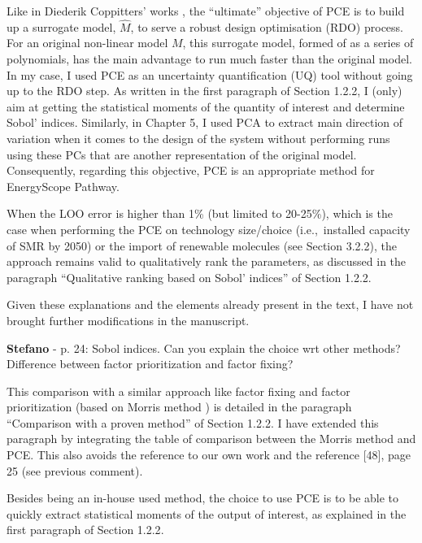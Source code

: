\documentclass[12pt,a4paper]{article}
\def\ie{i.e.,\ }
\begin{document}
\noindent Like in Diederik Coppitters' works \cite{coppitters2021robust,coppittersthesis}, the ``ultimate'' objective of PCE is to build up a surrogate model, $\hat{M}$, to serve a robust design optimisation (RDO) process. For an original non-linear model $M$, this surrogate model, formed of as a series of polynomials,  has the main advantage to run much faster than the original model. In my case, I used PCE as an uncertainty quantification (UQ) tool without going up to the RDO step. As written {\color{blue}in the first paragraph of Section 1.2.2}, I (only) aim at getting the statistical moments of the quantity of interest and determine Sobol' indices. Similarly, in Chapter 5, I used PCA to extract main direction of variation when it comes to the design of the system without performing runs using these PCs that are another representation of the original model. Consequently, regarding this objective, PCE is an appropriate method for EnergyScope Pathway. 

\noindent When the LOO error is higher than 1\% (but limited to 20-25\%), which is the case when performing the PCE on technology size/choice (\ie installed capacity of SMR by 2050) or the import of renewable molecules (see Section 3.2.2), the approach remains valid to qualitatively rank the parameters, {\color{blue}as discussed in the paragraph ``Qualitative ranking based on Sobol' indices'' of Section 1.2.2}.

\noindent Given these explanations and the elements already present in the text, I have not brought further modifications in the manuscript.

\begin{mdframed}[style=comment] %
{\color{orange} \textbf{Stefano}} - p. 24: Sobol indices. Can you explain the choice wrt other methods? Difference between factor prioritization and factor fixing?
\end{mdframed}

\noindent This comparison with a similar approach like factor fixing and factor prioritization (based on Morris method \cite{morris_factorial_1991}) is detailed {\color{blue}in the paragraph ``Comparison with a proven method'' of Section 1.2.2}. I have extended this paragraph by integrating the table of comparison between the Morris method and PCE.  This also avoids the reference to our own work and the reference [48], page 25 (see previous comment).

\noindent Besides being an in-house used method, the choice to use PCE is to be able to quickly extract statistical moments of the output of interest, as explained {\color{blue}in the first paragraph of Section 1.2.2}.
\end{document}
